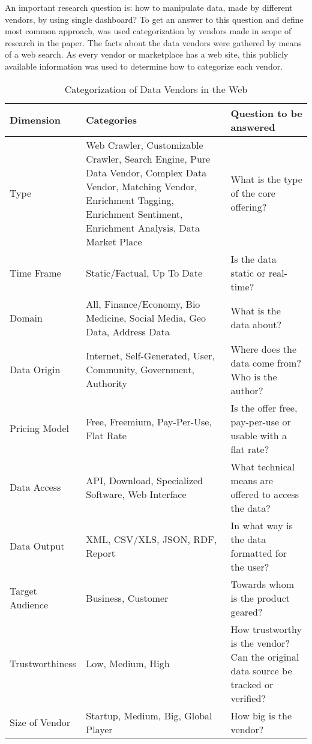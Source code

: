 	An important research question is: how to manipulate data, made by different vendors, by using single dashboard? To get an answer to this question and define most common approach, was used categorization by vendors made in scope of research in the paper\cite{schomm2013marketplaces}. The facts about the data vendors were gathered by means of a web search. As every vendor or marketplace has a web site, this publicly available information was used to determine how to categorize each vendor.
	\begin{table}[H]
	\centering
	\begin{tabular}{|L{2.5cm}|L{7cm}|L{6cm}|}
	\hline
	\textbf{Dimension} 			& \textbf{Categories} & \textbf{Question to be answered} \\
	\hline
	\hline 
	Type		                & Web Crawler, Customizable Crawler, Search Engine, Pure Data Vendor, Complex Data Vendor, Matching 
	                                   Vendor, Enrichment Tagging, Enrichment Sentiment, Enrichment Analysis, Data Market Place & What is the type of the core offering?  \\
	\hline
	Time Frame	                & Static/Factual, Up To Date & Is the data static or real-time?  \\
	\hline
	Domain		                & All, Finance/Economy, Bio Medicine, Social Media, Geo Data, Address Data & What is the data about?  \\
	\hline
	Data Origin                 & Internet, Self-Generated, User, Community, Government, Authority & Where does the data come 
	                                       from?Who is the author?  \\
	\hline
	Pricing Model		        & Free, Freemium, Pay-Per-Use, Flat Rate & Is the offer free, pay-per-use or usable with a flat rate? \\
	\hline
	Data Access		            & API, Download, Specialized Software, Web Interface & What technical means are offered to access the data? \\
	\hline
	Data Output		            & XML, CSV/XLS, JSON, RDF, Report& In what way is the data formatted for the user?  \\
	\hline 
	Target Audience		        & Business, Customer & Towards whom is the product geared?  \\
	\hline
	Trustworthiness	            & Low, Medium, High & How trustworthy is the vendor? Can the original data source be tracked or verified?  \\
	\hline 		
	Size of Vendor 		        & Startup, Medium, Big, Global Player & How big is the vendor?  \\
	\hline 
	\end{tabular}
	\caption[Categorization of Data Vendors in the Web]{Categorization of Data Vendors in the Web}
	\label{tab:categorization}
	\end{table}

